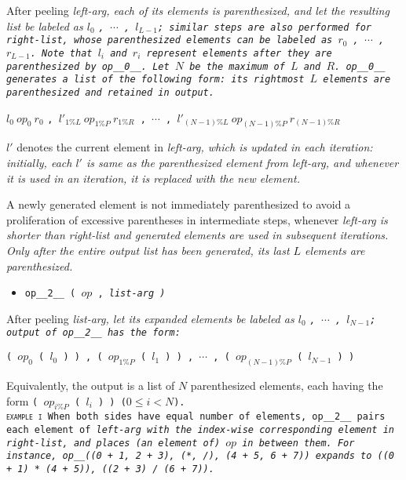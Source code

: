 After peeling \it{left-arg}, each of its elements is parenthesized, and let
the resulting list be labeled as $l_0$ \tt{,} $\cdots$ \tt{,} $l_{L - 1}$;
similar steps are also performed for \it{right-list}, whose parenthesized
elements can be labeled as $r_0$ \tt{,} $\cdots$ \tt{,} $r_{L - 1}$.
Note that $l_i$ and $r_i$ represent elements
after they are parenthesized by \tt{op__0__}.
Let $N$ be the maximum of $L$ and $R$.
\tt{op__0__} generates a list of the following form:
its rightmost $L$ elements are parenthesized and retained in output.

\begin{center}
$l_0\ op_0\ r_0$ \tt{,}
$l'_{1\%L}\ op_{1\%P}\ r_{1\%R}$ \tt{,}
$\cdots$ \tt{,}
$l'_{(N - 1)\%L}\ op_{(N - 1)\%P}\ r_{(N - 1)\%R}$
\end{center}

$l'$ denotes the current element in \it{left-arg}, which is
updated in each iteration: initially, each $l'$ is same as
the parenthesized element from \it{left-arg}, and whenever it
is used in an iteration, it is replaced with the new element.

\note A newly generated element is not immediately parenthesized to avoid
a proliferation of excessive \mbox{parentheses} in intermediate steps,
whenever \it{left-arg} is shorter than \it{right-list}
and generated elements are used in subsequent iterations.
Only after the entire output list has been generated,
its last $L$ elements are parenthesized.

\begin{itemize}
\item \tt{op__2__ (} $op$ \tt{,} \it{list-arg} \tt{)}
\end{itemize}

After peeling \it{list-arg}, let its expanded elements be labeled as
$l_0$ \tt{,} $\cdots$ \tt{,} $l_{N - 1}$; output of \tt{op__2__} has the form:

\begin{center}
\tt{(} $op_0$ \tt{(} $l_0$ \tt{) ) ,}
\tt{(} $op_{1\%P}$ \tt{(} $l_1$ \tt{) ) ,}
$\cdots$ \tt{,}
\tt{(} $op_{(N - 1)\%P}$ \tt{(} $l_{N - 1}$ \tt{) )}
\end{center}

Equivalently, the output is a list of $N$ parenthesized elements,
each having the form \tt{(} $op_{i\%P}$ \tt{(} $l_i$ \tt{) )} ($0 \le i < N$).\\

\textsc{example i}\indent
When both sides have equal number of elements, \tt{op__2__} pairs each element
of \it{left-arg} with the index-wise corresponding element in \it{right-list},
and places (an element of) $op$ in between them.
For instance, \tt{op__((0 + 1, 2 + 3), (*, /), (4 + 5, 6 + 7))}
expands to \tt{((0 + 1) * (4 + 5)), ((2 + 3) / (6 + 7))}.

